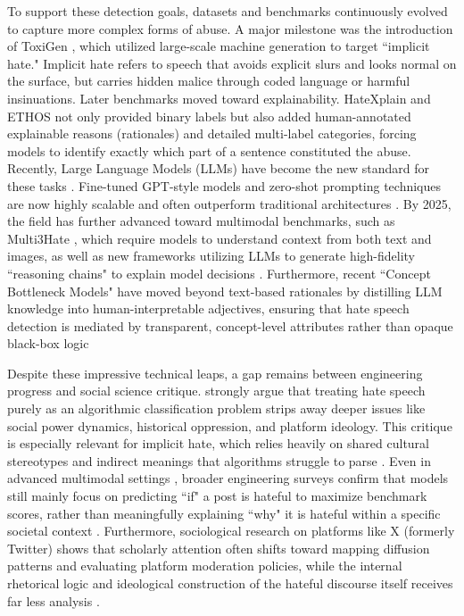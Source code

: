 \documentclass[../CLthesis.tex]{subfiles}
\begin{document}
To support these detection goals, datasets and benchmarks continuously evolved to capture more complex forms of abuse. A major milestone was the introduction of ToxiGen \citep{hartvigsen_toxigen_2022}, which utilized large-scale machine generation to target ``implicit hate." Implicit hate refers to speech that avoids explicit slurs and looks normal on the surface, but carries hidden malice through coded language or harmful insinuations. Later benchmarks moved toward explainability. HateXplain \citep{mathew_hatexplain_2021} and ETHOS \citep{mollas_ethos_2022} not only provided binary labels but also added human-annotated explainable reasons (rationales) and detailed multi-label categories, forcing models to identify exactly which part of a sentence constituted the abuse. Recently, Large Language Models (LLMs) have become the new standard for these tasks \citep{jahan_systematic_2023, rawat_hate_2024, ramos_comprehensive_2024, albladi_hate_2025}. Fine-tuned GPT-style models and zero-shot prompting techniques are now highly scalable and often outperform traditional architectures \citep{choudhary_hate_2025}. By 2025, the field has further advanced toward multimodal benchmarks, such as Multi3Hate \citep{bbui_multi3hate_2025}, which require models to understand context from both text and images, as well as new frameworks utilizing LLMs to generate high-fidelity ``reasoning chains" to explain model decisions \citep{hashir-targe-2025}. Furthermore, recent ``Concept Bottleneck Models" have moved beyond text-based rationales by distilling LLM knowledge into human-interpretable adjectives, ensuring that hate speech detection is mediated by transparent, concept-level attributes rather than opaque black-box logic \citep{labadietamayo2025distillingknowledgelargelanguage}

Despite these impressive technical leaps, a gap remains between engineering progress and social science critique. \citet{matamoros-fernandez_racism_2021} strongly argue that treating hate speech purely as an algorithmic classification problem strips away deeper issues like social power dynamics, historical oppression, and platform ideology. This critique is especially relevant for implicit hate, which relies heavily on shared cultural stereotypes and indirect meanings that algorithms struggle to parse \citep{elsherief_latent_2021}. Even in advanced multimodal settings \citep{kapil_transformer_2025}, broader engineering surveys confirm that models still mainly focus on predicting ``if" a post is hateful to maximize benchmark scores, rather than meaningfully explaining ``why" it is hateful within a specific societal context \citep{mannepalli_comprehensive_2025}. Furthermore, sociological research on platforms like X (formerly Twitter) shows that scholarly attention often shifts toward mapping diffusion patterns and evaluating platform moderation policies, while the internal rhetorical logic and ideological construction of the hateful discourse itself receives far less analysis \citep{matarin_propagation_2025}.
\end{document}
